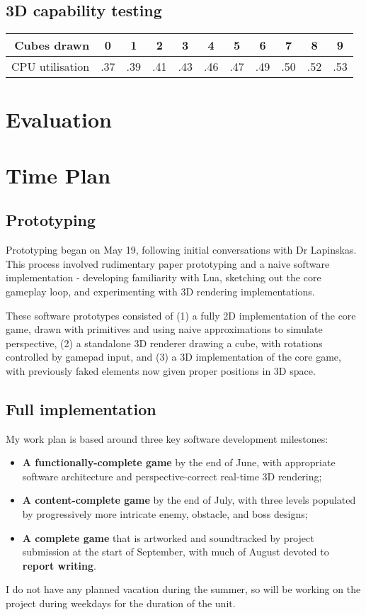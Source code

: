 \documentclass{article}
\begin{document}
\subsection*{3D capability testing}
\begin{center}
\begin{tabular}{r|c c c c c c c c c c}
     Cubes drawn & 0 & 1 & 2 & 3 & 4 & 5 & 6 & 7 & 8 & 9 \\
     \hline
     CPU utilisation & .37 & .39 & .41 & .43 & .46 & .47 & .49 & .50 & .52 & .53
\end{tabular}
\end{center}

\section{Evaluation}

\section{Time Plan}
\subsection*{Prototyping}
Prototyping began on May 19, following initial conversations with Dr Lapinskas. This process involved
rudimentary paper prototyping and a naive software implementation - developing familiarity with Lua,
sketching out the core gameplay loop, and experimenting with 3D rendering implementations. 

These software prototypes consisted of (1) a fully 2D implementation of the core game,
drawn with primitives and using naive approximations to simulate perspective,
(2) a standalone 3D renderer drawing a cube, with rotations controlled by gamepad input,
and (3) a 3D implementation of the core game, with previously faked elements
now given proper positions in 3D space.

\subsection*{Full implementation}
My work plan is based around three key software development milestones:
\begin{itemize}
    \item \textbf{A functionally-complete game} by the end of June,
    with appropriate software architecture\cite{nystrom}
    and perspective-correct real-time 3D rendering\cite{gambetta};
    \item \textbf{A content-complete game} by the end of July,
    with three levels populated by progressively more intricate enemy, obstacle, and boss designs;
    \item \textbf{A complete game} that is artworked and soundtracked
    by project submission at the start of September, with much of August devoted to
    \textbf{report writing}.
\end{itemize}
I do not have any planned vacation during the summer, so will be working on the
project during weekdays for the duration of the unit.

\printbibliography
\end{document}
